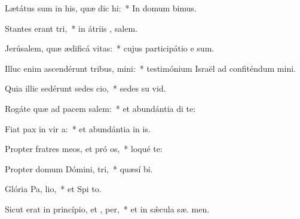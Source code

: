 \item Lætátus sum in his, quæ dic  hi:~* In domum  bimus.
\item Stantes erant  tri,~* in átriis , salem.
\item Jerúsalem, quæ ædificá  vitas:~* cujus participátio e  sum.
\item Illuc enim ascendérunt tribus,  mini:~* testimónium Israël ad confiténdum  mini.
\item Quia illic sedérunt sedes  cio,~* sedes su  vid.
\item Rogáte quæ ad pacem  salem:~* et abundántia di te:
\item Fiat pax in vir a:~* et abundántia in  is.
\item Propter fratres meos, et pró os,~* loqué   te:
\item Propter domum Dómini,  tri,~* quæsí  bi.
\item Glória Pa,  lio,~* et Spi to.
\item Sicut erat in princípio, et ,  per,~* et in sǽcula sæ. men.
